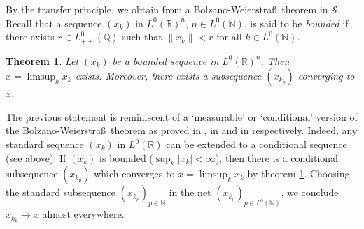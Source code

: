 \documentclass{jloganal}
\numberwithin{equation}{section}
\theoremstyle{plain}
\newtheorem{theorem}[subsection]{Theorem}
\newcommand\N{\mathbb{N}}
\begin{document}
By the transfer principle, we obtain from \cite[Lemma III.2.1]{simpson2009subsystems} a Bolzano-Weierstra\ss~theorem in $\mathcal{S}$. 
Recall that a sequence $(x_k)$ in $L^0(\mathbb{R})^n$, $n\in L^0(\N)$, is said to be \emph{bounded} if there exists $r\in L^0_{++}(\mathbb{Q})$ such that $\|x_k\|<r$ for all $k\in L^0(\N)$.   
\begin{theorem}\label{t:BW}
Let $(x_k)$ be a bounded sequence in $L^0(\mathbb{R})^n$. Then $x=\limsup_k x_k$ exists.   
Moreover, there exists a subsequence $(x_{k_p})$ converging to $x$.  
\end{theorem}
The previous statement is reminiscent of  a `measurable' or `conditional' version of the Bolzano-Weierstra\ss~theorem as proved in \cite[Lemma 2]{kabanov2001teachers},  in \cite[Lemma 1.64]{foellmer2011stochastic} and in \cite[Theorem 3.8]{cheridito2015conditional} respectively. 
Indeed, any standard sequence $(x_k)$ in $L^0(\mathbb{R})$ can be extended to a conditional sequence (see above). 
If $(x_k)$ is bounded ($\sup_k |x_k|<\infty$), then there is a conditional subsequence $(x_{k_p})$ which converges to $x=\limsup_k x_k$ by theorem \ref{t:BW}.  
Choosing the standard subsequence $(x_{k_p})_{p\in \N}$ in the net $(x_{k_p})_{p\in L^0(\N)}$, we conclude $x_{k_p}\to x$ almost everywhere.  
 
\end{document}
